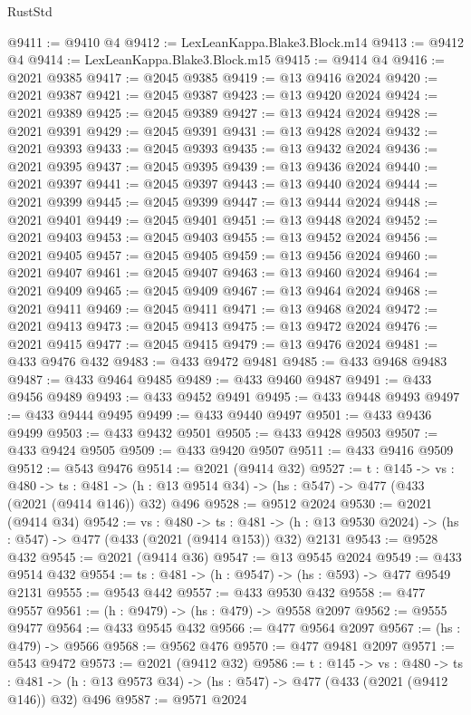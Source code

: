 \begin{lexlean}{RustStd}
\begin{coremodule}
{\begin{coremodule}
{{{{{{{{{{{{{{{{@9411 := @9410 @4
@9412 := LexLeanKappa.Blake3.Block.m14
@9413 := @9412 @4
@9414 := LexLeanKappa.Blake3.Block.m15
@9415 := @9414 @4
@9416 := @2021 @9385
@9417 := @2045 @9385
@9419 := @13 @9416 @2024
@9420 := @2021 @9387
@9421 := @2045 @9387
@9423 := @13 @9420 @2024
@9424 := @2021 @9389
@9425 := @2045 @9389
@9427 := @13 @9424 @2024
@9428 := @2021 @9391
@9429 := @2045 @9391
@9431 := @13 @9428 @2024
@9432 := @2021 @9393
@9433 := @2045 @9393
@9435 := @13 @9432 @2024
@9436 := @2021 @9395
@9437 := @2045 @9395
@9439 := @13 @9436 @2024
@9440 := @2021 @9397
@9441 := @2045 @9397
@9443 := @13 @9440 @2024
@9444 := @2021 @9399
@9445 := @2045 @9399
@9447 := @13 @9444 @2024
@9448 := @2021 @9401
@9449 := @2045 @9401
@9451 := @13 @9448 @2024
@9452 := @2021 @9403
@9453 := @2045 @9403
@9455 := @13 @9452 @2024
@9456 := @2021 @9405
@9457 := @2045 @9405
@9459 := @13 @9456 @2024
@9460 := @2021 @9407
@9461 := @2045 @9407
@9463 := @13 @9460 @2024
@9464 := @2021 @9409
@9465 := @2045 @9409
@9467 := @13 @9464 @2024
@9468 := @2021 @9411
@9469 := @2045 @9411
@9471 := @13 @9468 @2024
@9472 := @2021 @9413
@9473 := @2045 @9413
@9475 := @13 @9472 @2024
@9476 := @2021 @9415
@9477 := @2045 @9415
@9479 := @13 @9476 @2024
@9481 := @433 @9476 @432
@9483 := @433 @9472 @9481
@9485 := @433 @9468 @9483
@9487 := @433 @9464 @9485
@9489 := @433 @9460 @9487
@9491 := @433 @9456 @9489
@9493 := @433 @9452 @9491
@9495 := @433 @9448 @9493
@9497 := @433 @9444 @9495
@9499 := @433 @9440 @9497
@9501 := @433 @9436 @9499
@9503 := @433 @9432 @9501
@9505 := @433 @9428 @9503
@9507 := @433 @9424 @9505
@9509 := @433 @9420 @9507
@9511 := @433 @9416 @9509
@9512 := @543 @9476
@9514 := @2021 (@9414 @32)
@9527 := {t : @145} ->
  {vs : @480} ->
  {ts : @481} -> (h : @13 @9514 @34) -> (hs : @547) -> @477 (@433 (@2021 (@9414 @146)) @32) @496
@9528 := @9512 @2024
@9530 := @2021 (@9414 @34)
@9542 := {vs : @480} ->
  {ts : @481} -> (h : @13 @9530 @2024) -> (hs : @547) -> @477 (@433 (@2021 (@9414 @153)) @32) @2131
@9543 := @9528 @432
@9545 := @2021 (@9414 @36)
@9547 := @13 @9545 @2024
@9549 := @433 @9514 @432
@9554 := {ts : @481} -> (h : @9547) -> (hs : @593) -> @477 @9549 @2131
@9555 := @9543 @442
@9557 := @433 @9530 @432
@9558 := @477 @9557
@9561 := (h : @9479) -> (hs : @479) -> @9558 @2097
@9562 := @9555 @9477
@9564 := @433 @9545 @432
@9566 := @477 @9564 @2097
@9567 := (hs : @479) -> @9566
@9568 := @9562 @476
@9570 := @477 @9481 @2097
@9571 := @543 @9472
@9573 := @2021 (@9412 @32)
@9586 := {t : @145} ->
  {vs : @480} ->
  {ts : @481} -> (h : @13 @9573 @34) -> (hs : @547) -> @477 (@433 (@2021 (@9412 @146)) @32) @496
@9587 := @9571 @2024
}}}}}}}}}}}}}}}}
\end{coremodule}}
\end{coremodule}
\end{lexlean}
